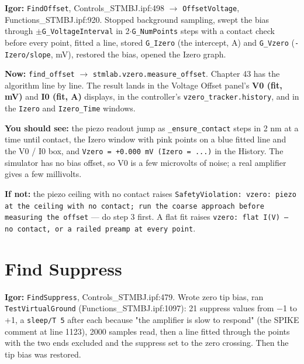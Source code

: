 \textbf{Igor:} \texttt{Find\discretionary{}{}{}Offset}, Controls\_STMBJ.ipf:498 $\rightarrow$ \texttt{Offset\discretionary{}{}{}Voltage}, Functions\_STMBJ.ipf:920. Stopped background sampling, swept the bias through $\pm$\texttt{G\_\discretionary{}{}{}Voltage\discretionary{}{}{}Interval} in 2$\cdot$\texttt{G\_\discretionary{}{}{}Num\discretionary{}{}{}Points} steps with a contact check before every point, fitted a line, stored \texttt{G\_\discretionary{}{}{}Izero} (the intercept, \textmu{}A) and \texttt{G\_\discretionary{}{}{}Vzero} (\texttt{-Izero/\discretionary{}{}{}slope}, mV), restored the bias, opened the Izero graph.

\textbf{Now:} \texttt{find\_\discretionary{}{}{}offset} $\rightarrow$ \texttt{stmlab.\discretionary{}{}{}vzero.\discretionary{}{}{}measure\_\discretionary{}{}{}offset}. Chapter 43 has the algorithm line by line. The result lands in the Voltage Offset panel's \textbf{V0 (fit, mV)} and \textbf{I0 (fit, \textmu{}A)} displays, in the controller's \texttt{vzero\_\discretionary{}{}{}tracker.\discretionary{}{}{}history}, and in the \texttt{Izero} and \texttt{Izero\_\discretionary{}{}{}Time} windows.

\textbf{You should see:} the piezo readout jump as \texttt{\_\discretionary{}{}{}ensure\_\discretionary{}{}{}contact} steps in 2 nm at a time until contact, the Izero window with pink points on a blue fitted line and the V0 / I0 box, and \texttt{Vzero = +0.\discretionary{}{}{}000 m\discretionary{}{}{}V (Izero = .\discretionary{}{}{}.\discretionary{}{}{}.\discretionary{}{}{})} in the History. The simulator has no bias offset, so V0 is a few microvolts of noise; a real amplifier gives a few millivolts.

\textbf{If not:} the piezo ceiling with no contact raises \texttt{Safety\discretionary{}{}{}Violation: vzero: piezo at the ceiling with no contact; run the coarse approach before measuring the offset} --- do step 3 first. A flat fit raises \texttt{vzero: flat I(V) -- no contact,\discretionary{}{}{} or a railed preamp at every point}.

\section{Find Suppress}

\textbf{Igor:} \texttt{Find\discretionary{}{}{}Suppress}, Controls\_STMBJ.ipf:479. Wrote zero tip bias, ran \texttt{Test\discretionary{}{}{}Virtual\discretionary{}{}{}Ground} (Functions\_STMBJ.ipf:1097): 21 suppress values from −1 to +1, a \texttt{sleep/\discretionary{}{}{}T 5} after each because "the amplifier is slow to respond" (the SPIKE comment at line 1123), 2000 samples read, then a line fitted through the points with the two ends excluded and the suppress set to the zero crossing. Then the tip bias was restored.

